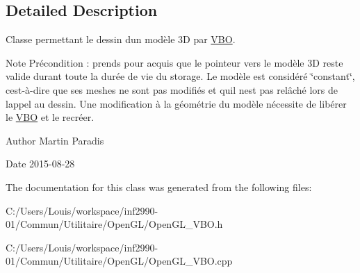 \subsection{Detailed Description}
Classe permettant le dessin d\textquotesingle{}un modèle 3\+D par \hyperlink{classopengl_1_1_v_b_o}{V\+B\+O}. 

\begin{DoxyNote}{Note}
Précondition \+: prends pour acquis que le pointeur vers le modèle 3\+D reste valide durant toute la durée de vie du storage. Le modèle est considéré \char`\"{}constant\char`\"{}, c\textquotesingle{}est-\/à-\/dire que ses meshes ne sont pas modifiés et qu\textquotesingle{}il n\textquotesingle{}est pas relâché lors de l\textquotesingle{}appel au dessin. Une modification à la géométrie du modèle nécessite de libérer le \hyperlink{classopengl_1_1_v_b_o}{V\+B\+O} et le recréer.
\end{DoxyNote}
\begin{DoxyAuthor}{Author}
Martin Paradis 
\end{DoxyAuthor}
\begin{DoxyDate}{Date}
2015-\/08-\/28 
\end{DoxyDate}


The documentation for this class was generated from the following files\+:\begin{DoxyCompactItemize}
\item 
C\+:/\+Users/\+Louis/workspace/inf2990-\/01/\+Commun/\+Utilitaire/\+Open\+G\+L/Open\+G\+L\+\_\+\+V\+B\+O.\+h\item 
C\+:/\+Users/\+Louis/workspace/inf2990-\/01/\+Commun/\+Utilitaire/\+Open\+G\+L/Open\+G\+L\+\_\+\+V\+B\+O.\+cpp\end{DoxyCompactItemize}
